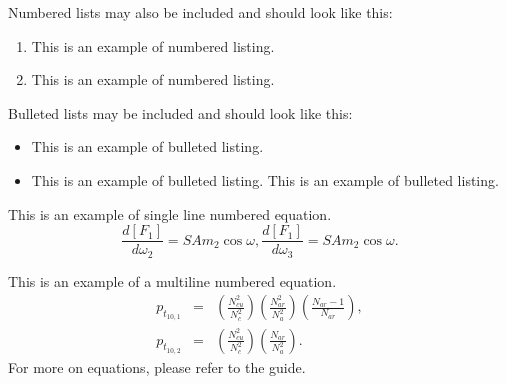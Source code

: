 \documentclass{aip-cp}
\begin{document}
\noindent Numbered lists may also be included and should look like this:

\begin{enumerate}
\item This is an example of numbered listing.
\item This is an example of numbered listing.
\end{enumerate}

\noindent Bulleted lists may be included and should look like this:

\begin{itemize}
\item This is an example of bulleted listing.
\item This is an example of bulleted listing. This is an example of bulleted listing.
\end{itemize}

\noindent This is an example of single line numbered equation.
\begin{equation}
\frac{d[F_1]}{d\omega_2} = SAm_2\cos\omega,\frac{d[F_1]}{d\omega_3}= SAm_2\cos\omega.
\end{equation}

This is an example of a multiline numbered equation.
\begin{eqnarray}
p_{t_{10,1}}&=&\left(\frac{N_{cu}^2}{ N_c ^2}\right)\left(\frac{N_{ar}^2}{N_a^2}\right)\left(\frac{N_{ar}-1}{N_{ar}}\right),\\
p_{t_{10,2}}&=&\left(\frac{N_{cu}^2}{ N_c ^2}\right)\left(\frac{N_{ar}}{N_a^2}\right).
\end{eqnarray}
For more on equations, please refer to the guide.


\end{document}
